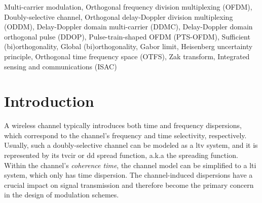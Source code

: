 \documentclass[journal]{IEEEtran}
\begin{document}
\begin{IEEEkeywords}
  Multi-carrier modulation, Orthogonal frequency division multiplexing (OFDM), Doubly-selective channel, Orthogonal delay-Doppler division multiplexing (ODDM), Delay-Doppler domain multi-carrier (DDMC), Delay-Doppler domain orthogonal pulse (DDOP), Pulse-train-shaped OFDM (PTS-OFDM), Sufficient (bi)orthogonality, Global (bi)orthogonality, Gabor limit, Heisenberg uncertainty principle, Orthogonal time frequency space (OTFS), Zak transform, Integrated sensing and communications (ISAC)
\end{IEEEkeywords}


%

\IEEEpeerreviewmaketitle

\begin{figure}
\printacronyms[template=twocolumn]
\end{figure}


\section{Introduction}
% 
% 
% 
% 

A wireless channel typically introduces both time and frequency dispersions, which correspond to the channel's frequency and time selectivity, respectively. Usually, such a doubly-selective channel can be modeled as a \ac{ltv} system, and it is represented by its \ac{tvcir} or \ac{dd} spread function\cite{bello}, a.k.a the spreading function\cite{Hlawatsch2011}.
Within the channel's \emph{coherence time}, the channel model can be simplified to a \ac{lti} system, which only has time dispersion.
The channel-induced dispersions have a crucial impact on signal transmission and therefore become the primary concern in the design of modulation schemes.
\end{document}

